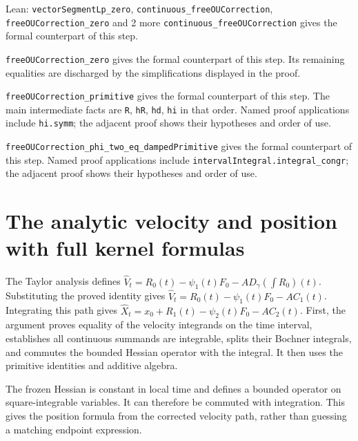 \documentclass[11pt,a4paper]{article}
\begin{document}
\begin{leanbox}{Lean: \texttt{vectorSegmentLp\_\allowbreak{}zero}, \texttt{continuous\_\allowbreak{}freeOUCorrection}, \texttt{freeOUCorrection\_\allowbreak{}zero} and 2 more}
\texttt{continuous\_\allowbreak{}free\allowbreak{}OUCorrection} gives the formal counterpart of this step.




\texttt{free\allowbreak{}OUCorrection\_\allowbreak{}zero} gives the formal counterpart of this step. Its remaining equalities are discharged by the simplifications displayed in the proof.




\texttt{free\allowbreak{}OUCorrection\_\allowbreak{}primitive} gives the formal counterpart of this step. The main intermediate facts are \texttt{R}, \texttt{h\allowbreak{}R}, \texttt{hd}, \texttt{hi} in that order. Named proof applications include \texttt{hi.\allowbreak{}symm}; the adjacent proof shows their hypotheses and order of use.




\texttt{free\allowbreak{}OUCorrection\_\allowbreak{}phi\_\allowbreak{}two\_\allowbreak{}eq\_\allowbreak{}damped\allowbreak{}Primitive} gives the formal counterpart of this step. Named proof applications include \texttt{interval\allowbreak{}Integral.\allowbreak{}integral\_\allowbreak{}congr}; the adjacent proof shows their hypotheses and order of use.
\end{leanbox}

\section{\texorpdfstring{The analytic velocity and position with full kernel formulas}{The analytic velocity and position with full kernel formulas}}


The Taylor analysis defines \(\widehat V_t=R_0(t)-\psi_1(t)F_0-A D_\gamma(\int R_0)(t)\). Substituting the proved identity gives \(\widehat V_t=R_0(t)-\psi_1(t)F_0-AC_1(t)\). Integrating this path gives \(\widehat X_t=x_0+R_1(t)-\psi_2(t)F_0-AC_2(t)\). First, the argument proves equality of the velocity integrands on the time interval, establishes all continuous summands are integrable, splits their Bochner integrals, and commutes the bounded Hessian operator with the integral. It then uses the primitive identities and additive algebra.



The frozen Hessian is constant in local time and defines a bounded operator on square-integrable variables. It can therefore be commuted with integration. This gives the position formula from the corrected velocity path, rather than guessing a matching endpoint expression.
\end{document}
